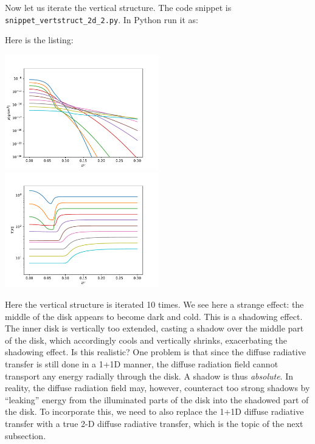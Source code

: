 \documentclass{book}
\newcommand{\code}[1]{{\small\tt #1}}
\begin{document}
Now let us iterate the vertical structure. The code snippet is
\code{snippet\_vertstruct\_2d\_2.py}. In Python run it as:
\begin{codebox}
\end{codebox}
Here is the listing:

\centerline{\includegraphics[width=0.5\textwidth]{../snippets/fig_snippet_vertstruct_2d_2_1.pdf}
\includegraphics[width=0.5\textwidth]{../snippets/fig_snippet_vertstruct_2d_2_2.pdf}}
%
Here the vertical structure is iterated 10 times. We see here a strange effect: the
middle of the disk appears to become dark and cold. This is a shadowing effect. The
inner disk is vertically too extended, casting a shadow over the middle part of the
disk, which accordingly cools and vertically shrinks, exacerbating the shadowing
effect. Is this realistic? One problem is that since the diffuse radiative transfer
is still done in a 1+1D manner, the diffuse radiation field cannot transport any
energy radially through the disk. A shadow is thus {\em absolute}. In reality, the
diffuse radiation field may, however, counteract too strong shadows by ``leaking''
energy from the illuminated parts of the disk into the shadowed part of the disk.
To incorporate this, we need to also replace the 1+1D diffuse radiative transfer
with a true 2-D diffuse radiative transfer, which is the topic of the next subsection.
\end{document}

